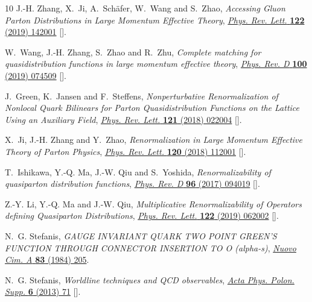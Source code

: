 \begin{thebibliography}{10}
J.-H. Zhang, X.~Ji, A.~Sch\"afer, W.~Wang and S.~Zhao, \emph{{Accessing Gluon
  Parton Distributions in Large Momentum Effective Theory}},
  \href{https://doi.org/10.1103/PhysRevLett.122.142001}{\emph{Phys. Rev. Lett.}
  {\bfseries 122} (2019) 142001}
  [\href{https://arxiv.org/abs/1808.10824}{{}}].

W.~Wang, J.-H. Zhang, S.~Zhao and R.~Zhu, \emph{{Complete matching for
  quasidistribution functions in large momentum effective theory}},
  \href{https://doi.org/10.1103/PhysRevD.100.074509}{\emph{Phys. Rev. D}
  {\bfseries 100} (2019) 074509}
  [\href{https://arxiv.org/abs/1904.00978}{{}}].

J.~Green, K.~Jansen and F.~Steffens, \emph{{Nonperturbative Renormalization of
  Nonlocal Quark Bilinears for Parton Quasidistribution Functions on the
  Lattice Using an Auxiliary Field}},
  \href{https://doi.org/10.1103/PhysRevLett.121.022004}{\emph{Phys. Rev. Lett.}
  {\bfseries 121} (2018) 022004}
  [\href{https://arxiv.org/abs/1707.07152}{{}}].

X.~Ji, J.-H. Zhang and Y.~Zhao, \emph{{Renormalization in Large Momentum
  Effective Theory of Parton Physics}},
  \href{https://doi.org/10.1103/PhysRevLett.120.112001}{\emph{Phys. Rev. Lett.}
  {\bfseries 120} (2018) 112001}
  [\href{https://arxiv.org/abs/1706.08962}{{}}].

T.~Ishikawa, Y.-Q. Ma, J.-W. Qiu and S.~Yoshida, \emph{{Renormalizability of
  quasiparton distribution functions}},
  \href{https://doi.org/10.1103/PhysRevD.96.094019}{\emph{Phys. Rev. D}
  {\bfseries 96} (2017) 094019}
  [\href{https://arxiv.org/abs/1707.03107}{{}}].

Z.-Y. Li, Y.-Q. Ma and J.-W. Qiu, \emph{{Multiplicative Renormalizability of
  Operators defining Quasiparton Distributions}},
  \href{https://doi.org/10.1103/PhysRevLett.122.062002}{\emph{Phys. Rev. Lett.}
  {\bfseries 122} (2019) 062002}
  [\href{https://arxiv.org/abs/1809.01836}{{}}].

N.~G. Stefanis, \emph{{GAUGE INVARIANT QUARK TWO POINT GREEN'S FUNCTION THROUGH
  CONNECTOR INSERTION TO O (alpha-s)}},
  \href{https://doi.org/10.1007/BF02902597}{\emph{Nuovo Cim. A} {\bfseries 83}
  (1984) 205}.

N.~G. Stefanis, \emph{{Worldline techniques and QCD observables}},
  \href{https://doi.org/10.5506/APhysPolBSupp.6.71}{\emph{Acta Phys. Polon.
  Supp.} {\bfseries 6} (2013) 71}
  [\href{https://arxiv.org/abs/1211.7218}{{}}].


\end{thebibliography}
